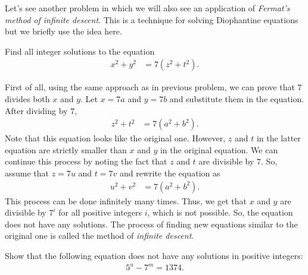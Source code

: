 \documentclass{subfile}
\begin{document}
				
			Let's see another problem in which we will also see an application of \textit{Fermat's method of infinite descent}. This is a technique for solving Diophantine equations but we briefly use the idea here.
				\begin{problem}
					Find all integer solutions to the equation
						\begin{align*}
							x^2+y^2 & = 7(z^2+t^2).
						\end{align*}
				\end{problem}
				
				\begin{solution}
					First of all, using the same approach as in previous problem, we can prove that $7$ divides both $x$ and $y$. Let $x=7a$ and $y=7b$ and substitute them in the equation. After dividing by $7$,
						\begin{align*}
							z^2+t^2 & = 7(a^2+b^2).
						\end{align*}
					Note that this equation looks like the original one. However, $z$ and $t$ in the latter equation are strictly smaller than $x$ and $y$ in the original equation. We can continue this process by noting the fact that $z$ and $t$ are divisible by $7$. So, assume that $z=7u$ and $t=7v$ and rewrite the equation as
						\begin{align*}
						u^2+v^2 & = 7(a^2+b^2).
						\end{align*}				
					This process can be done infinitely many times. Thus, we get that $x$ and $y$ are divisible by $7^i$ for all positive integers $i$, which is not possible. So, the equation does not have any solutions. The process of finding new equations similar to the original one is called the method of \textit{infinite descent}.
				\end{solution}
				
				
				\begin{problem}
					Show that the following equation does not have any solutions in positive integers:
						\begin{align*}
							5^n-7^m = 1374.
						\end{align*}
				\end{problem}
				
\end{document}
